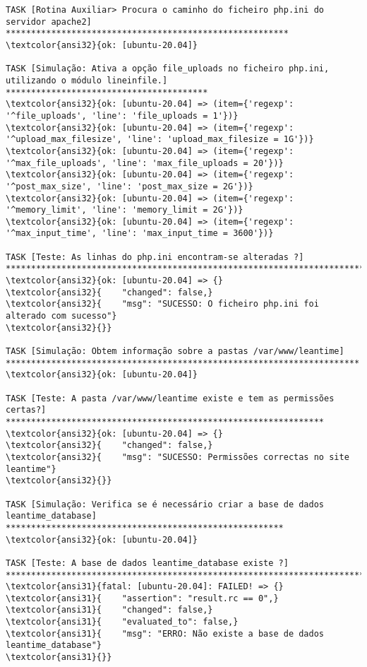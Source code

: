 \documentclass{scrartcl}
\begin{document}
\begin{Verbatim}
TASK [Rotina Auxiliar> Procura o caminho do ficheiro php.ini do servidor apache2] ********************************************************
\textcolor{ansi32}{ok: [ubuntu-20.04]}

TASK [Simulação: Ativa a opção file_uploads no ficheiro php.ini, utilizando o módulo lineinfile.] ****************************************
\textcolor{ansi32}{ok: [ubuntu-20.04] => (item={'regexp': '^file_uploads', 'line': 'file_uploads = 1'})}
\textcolor{ansi32}{ok: [ubuntu-20.04] => (item={'regexp': '^upload_max_filesize', 'line': 'upload_max_filesize = 1G'})}
\textcolor{ansi32}{ok: [ubuntu-20.04] => (item={'regexp': '^max_file_uploads', 'line': 'max_file_uploads = 20'})}
\textcolor{ansi32}{ok: [ubuntu-20.04] => (item={'regexp': '^post_max_size', 'line': 'post_max_size = 2G'})}
\textcolor{ansi32}{ok: [ubuntu-20.04] => (item={'regexp': '^memory_limit', 'line': 'memory_limit = 2G'})}
\textcolor{ansi32}{ok: [ubuntu-20.04] => (item={'regexp': '^max_input_time', 'line': 'max_input_time = 3600'})}

TASK [Teste: As linhas do php.ini encontram-se alteradas ?] ******************************************************************************
\textcolor{ansi32}{ok: [ubuntu-20.04] => {}
\textcolor{ansi32}{    "changed": false,}
\textcolor{ansi32}{    "msg": "SUCESSO: O ficheiro php.ini foi alterado com sucesso"}
\textcolor{ansi32}{}}

TASK [Simulação: Obtem informação sobre a pastas /var/www/leantime] **********************************************************************
\textcolor{ansi32}{ok: [ubuntu-20.04]}

TASK [Teste: A pasta /var/www/leantime existe e tem as permissões certas?] ***************************************************************
\textcolor{ansi32}{ok: [ubuntu-20.04] => {}
\textcolor{ansi32}{    "changed": false,}
\textcolor{ansi32}{    "msg": "SUCESSO: Permissões correctas no site leantime"}
\textcolor{ansi32}{}}

TASK [Simulação: Verifica se é necessário criar a base de dados leantime_database] *******************************************************
\textcolor{ansi32}{ok: [ubuntu-20.04]}

TASK [Teste: A base de dados leantime_database existe ?] *********************************************************************************
\textcolor{ansi31}{fatal: [ubuntu-20.04]: FAILED! => {}
\textcolor{ansi31}{    "assertion": "result.rc == 0",}
\textcolor{ansi31}{    "changed": false,}
\textcolor{ansi31}{    "evaluated_to": false,}
\textcolor{ansi31}{    "msg": "ERRO: Não existe a base de dados leantime_database"}
\textcolor{ansi31}{}}


\end{Verbatim}
\end{document}
